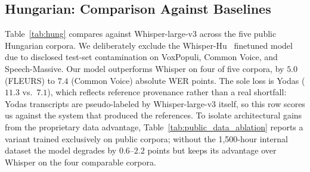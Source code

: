 \documentclass{article}
\begin{document}
\subsection{Hungarian: Comparison Against Baselines}
\noindent
Table~\ref{tab:hung} compares against Whisper-large-v3 across the five public Hungarian corpora. We deliberately exclude the Whisper-Hu~\cite{trendency2024whisperlargev3hu} finetuned model due to disclosed test-set contamination on VoxPopuli, Common Voice, and Speech-Massive. Our model outperforms Whisper on four of five corpora, by $5.0$ (FLEURS) to $7.4$ (Common Voice) absolute WER points. The sole loss is Yodas ($11.3$ vs.\ $7.1$), which reflects reference provenance rather than a real shortfall: Yodas transcripts are pseudo-labeled by Whisper-large-v3 itself, so this row scores us against the system that produced the references.
To isolate architectural gains from the proprietary data advantage, Table~\ref{tab:public_data_ablation} reports a variant trained exclusively on public corpora; without the 1,500-hour internal dataset the model degrades by $0.6$--$2.2$ points but keeps its advantage over Whisper on the four comparable corpora.

\begin{table}[h]
    \centering
    \caption{Hungarian ASR performance. Metrics and evaluation protocol as in Table~\ref{tab:greek};}
    \label{tab:hung}
    \footnotesize

\end{table}
\end{document}
